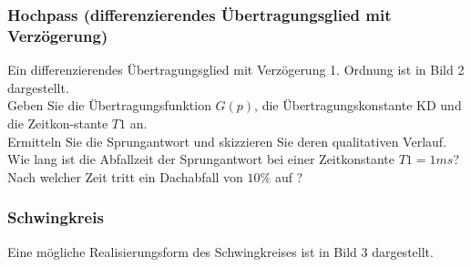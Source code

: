 \subsubsection{Hochpass (differenzierendes Übertragungsglied mit Verzögerung)}

Ein differenzierendes Übertragungsglied mit Verzögerung 1. Ordnung ist in Bild 2 dargestellt.\\
Geben  Sie  die  Übertragungsfunktion $G(p)$,  die  Übertragungskonstante  KD und die Zeitkon-stante $T1$ an.\\ 
Ermitteln Sie die Sprungantwort und skizzieren Sie deren qualitativen Verlauf.\\ 
Wie lang ist die Abfallzeit der Sprungantwort bei einer Zeitkonstante $T1 = 1 ms$?\\
Nach welcher Zeit tritt ein Dachabfall von $10\%$ auf ?\\

\subsubsection{Schwingkreis}

Eine mögliche Realisierungsform des Schwingkreises ist in Bild 3 dargestellt.\\

